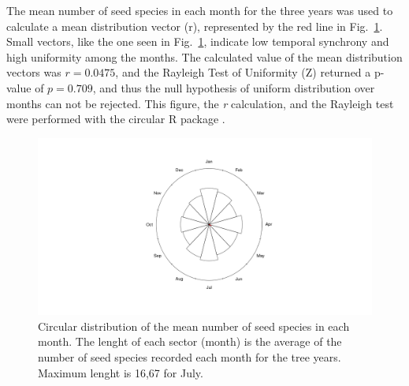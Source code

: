 \documentclass{article}
\begin{document}
The mean number of seed species in each month for the three years was
used to calculate a mean distribution vector (r), represented by the
red line in Fig.~\ref{fig:circular}. Small vectors, like the one
seen in Fig.~\ref{fig:circular}, indicate low temporal synchrony and
high uniformity among the months. The calculated value of the mean
distribution vectors was $r=0.0475$, and the Rayleigh Test of
Uniformity (Z) returned a p-value of $p=0.709$, and thus the null
hypothesis of uniform distribution over months can not be
rejected. This figure, the \emph{r} calculation, and the Rayleigh test
were performed with the circular R package \cite{circular}.

\begin{figure}[h!]
  \centering
  \includegraphics[width=\textwidth]{../figures/circular_distribution}
  \caption{Circular distribution of the mean number of seed species in
    each month. The lenght of each sector (month) is the average of
    the number of seed species recorded each month for the tree
    years. Maximum lenght is 16,67 for July. }
  \label{fig:circular}
\end{figure}

\FloatBarrier



\end{document}
